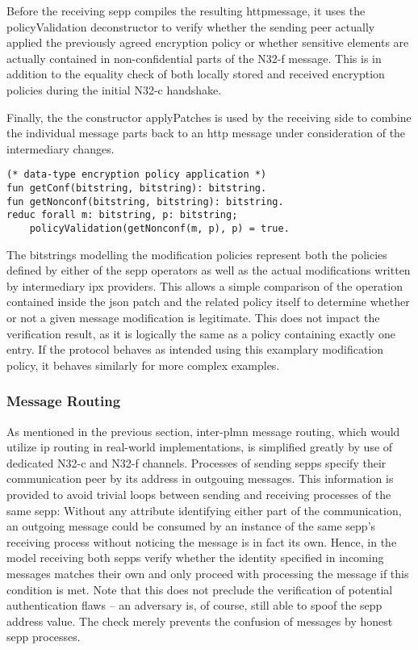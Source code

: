 Before the receiving \gls{sepp} compiles the resulting \gls{http}message, it uses the {\sffamily policyValidation} deconstructor to verify whether the sending peer actually applied the previously agreed encryption policy or whether sensitive elements are actually contained in non-confidential parts of the N32-f message.
This is in addition to the equality check of both locally stored and received encryption policies during the initial N32-c handshake.

Finally, the the constructor {\sffamily applyPatches} is used by the receiving side to combine the individual message parts back to an \gls{http} message under consideration of the intermediary changes.

\begin{lstlisting}[caption={N32-f message rewriting},label={lst:n32f-rewriting},firstnumber=105]
(* data-type encryption policy application *)
fun getConf(bitstring, bitstring): bitstring.
fun getNonconf(bitstring, bitstring): bitstring.
reduc forall m: bitstring, p: bitstring;
    policyValidation(getNonconf(m, p), p) = true.
\end{lstlisting}

The bitstrings modelling the modification policies represent both the policies defined by either of the \gls{sepp} operators as well as the actual modifications written by intermediary \gls{ipx} providers.
This allows a simple comparison of the operation contained inside the \gls{json} patch and the related policy itself to determine whether or not a given message modification is legitimate.
This does not impact the verification result, as it is logically the same as a policy containing exactly one entry.
If the protocol behaves as intended using this examplary modification policy, it behaves similarly for more complex examples.

\subsubsection{Message Routing}

As mentioned in the previous section, inter-\gls{plmn} message routing, which would utilize \gls{ip} routing in real-world implementations, is simplified greatly by use of dedicated N32-c and N32-f channels.
Processes of sending \glspl{sepp} specify their communication peer by its address in outgouing messages.
This information is provided to avoid trivial loops between sending and receiving processes of the same \gls{sepp}:
Without any attribute identifying either part of the communication, an outgoing message could be consumed by an instance of the same \gls{sepp}'s receiving process without noticing the message is in fact its own.
Hence, in the model receiving both \glspl{sepp} verify whether the identity specified in incoming messages matches their own and only proceed with processing the message if this condition is met.
Note that this does not preclude the verification of potential authentication flaws -- an adversary is, of course, still able to spoof the \gls{sepp} address value.
The check merely prevents the confusion of messages by honest \gls{sepp} processes.

